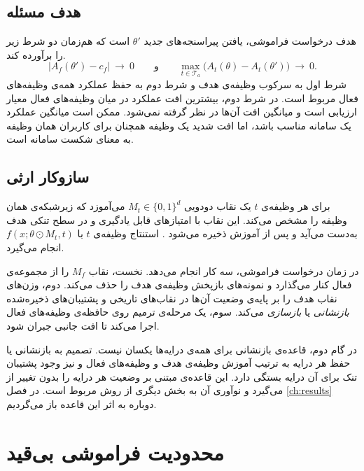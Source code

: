 \subsection{هدف مسئله}
\label{subsec:prop-objective}

هدف درخواست فراموشی، یافتن پیراسنجه‌های جدید $\theta'$ است که هم‌زمان دو شرط زیر را برآورده کند.
\begin{equation}
	\label{eq:objective}
	\big|A_f(\theta')-c_f\big|\ \to\ 0
	\qquad\text{و}\qquad
	\max_{t\in\mathcal{T}_a}\big(A_t(\theta)-A_t(\theta')\big)\ \to\ 0 .
\end{equation}
شرط اول به سرکوب وظیفه‌ی هدف و شرط دوم به حفظ عملکرد همه‌ی وظیفه‌های فعال مربوط است. در شرط دوم، بیشترین افت عملکرد در میان وظیفه‌های فعال معیار ارزیابی است و میانگین افت آن‌ها در نظر گرفته نمی‌شود. ممکن است میانگین عملکرد یک سامانه مناسب باشد، اما افت شدید یک وظیفه همچنان برای کاربران همان وظیفه به معنای شکست سامانه است.

\subsection{سازوکار ارثی }
\label{subsec:prop-pall}

 \cite{ozdenizci2025pall} برای هر وظیفه‌ی $t$ یک نقاب دودویی $M_t\in\{0,1\}^{d}$ می‌آموزد که زیرشبکه‌ی همان وظیفه را مشخص می‌کند. این نقاب با {امتیازهای قابل یادگیری} و در سطح تنکی هدف به‌دست می‌آید و پس از آموزش ذخیره می‌شود \cite{kang2022wsn,ramanujan2020hidden}. استنتاج وظیفه‌ی $t$ با $f(x;\theta\odot M_t,t)$ انجام می‌گیرد.

در زمان درخواست فراموشی،  سه کار انجام می‌دهد. نخست، نقاب $M_f$ را از مجموعه‌ی فعال کنار می‌گذارد و نمونه‌های بازپخش وظیفه‌ی هدف را حذف می‌کند. دوم، وزن‌های نقاب هدف را بر پایه‌ی وضعیت آن‌ها در نقاب‌های تاریخی و پشتیبان‌های ذخیره‌شده \emph{بازنشانی} یا \emph{بازسازی} می‌کند. سوم، یک مرحله‌ی ترمیم روی حافظه‌ی وظیفه‌های فعال اجرا می‌کند تا افت جانبی جبران شود.

در گام دوم، قاعده‌ی بازنشانی برای همه‌ی درایه‌ها یکسان نیست. تصمیم به بازنشانی یا حفظ هر درایه به ترتیب آموزش وظیفه‌ی هدف و وظیفه‌های فعال و نیز وجود پشتیبان تنک برای آن درایه بستگی دارد.  این قاعده‌ی مبتنی بر وضعیت هر درایه را بدون تغییر از  می‌گیرد و نوآوری آن به بخش دیگری از روش مربوط است. در فصل \ref{ch:results} دوباره به اثر این قاعده باز می‌گردیم.

\section{محدودیت فراموشی بی‌قید}
\label{sec:prop-limitation}

